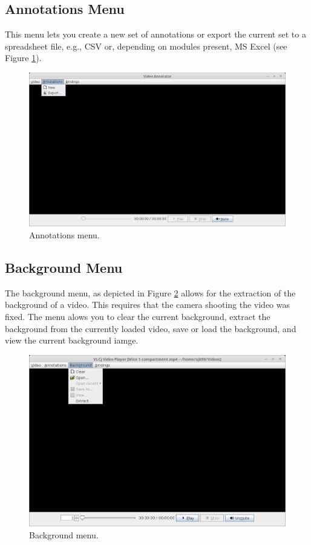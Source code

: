 \documentclass[a4paper]{book}
\begin{document}
\subsection{Annotations Menu}
This menu lets you create a new set of annotations or export the current
set to a spreadsheet file, e.g., CSV or, depending on modules present,
MS Excel (see Figure \ref{AnnotatorAnnotationMenu}).

\begin{figure}[htb]
  \centering
  \includegraphics[width=12.0cm]{images/AnnotatorAnnotationMenu.png}
  \caption{Annotations menu.}
  \label{AnnotatorAnnotationMenu}
\end{figure}

\subsection{Background Menu}
The background menu, as depicted in Figure \ref{AnnotatorBackgroundMenu} allows for the extraction of the background
of a video. This requires that the camera shooting the video was fixed. The menu alows you to clear the current
background, extract the background from the currently loaded video, save or load the background, and view the
current background iamge.


\begin{figure}[htb]
  \centering
  \includegraphics[width=12.0cm]{images/AnnotatorBackgroundMenu.png}
  \caption{Background menu.}
  \label{AnnotatorBackgroundMenu}
\end{figure}
\end{document}
